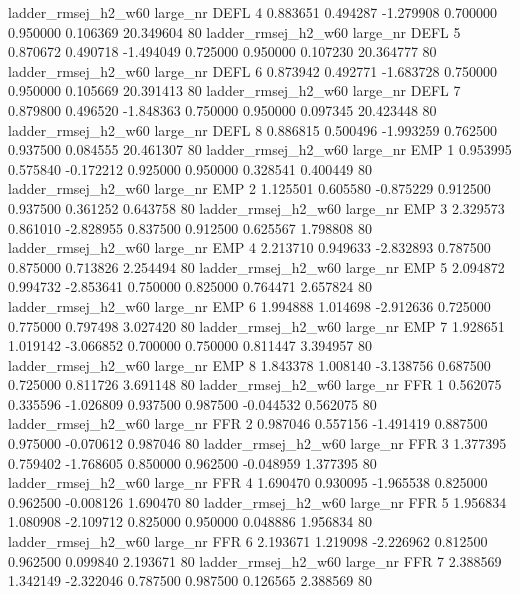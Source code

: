 ladder_rmsej_h2_w60   large_nr     DEFL                 4  0.883651  0.494287  -1.279908 0.700000 0.950000  0.106369   20.349604 80
ladder_rmsej_h2_w60   large_nr     DEFL                 5  0.870672  0.490718  -1.494049 0.725000 0.950000  0.107230   20.364777 80
ladder_rmsej_h2_w60   large_nr     DEFL                 6  0.873942  0.492771  -1.683728 0.750000 0.950000  0.105669   20.391413 80
ladder_rmsej_h2_w60   large_nr     DEFL                 7  0.879800  0.496520  -1.848363 0.750000 0.950000  0.097345   20.423448 80
ladder_rmsej_h2_w60   large_nr     DEFL                 8  0.886815  0.500496  -1.993259 0.762500 0.937500  0.084555   20.461307 80
ladder_rmsej_h2_w60   large_nr      EMP                 1  0.953995  0.575840  -0.172212 0.925000 0.950000  0.328541    0.400449 80
ladder_rmsej_h2_w60   large_nr      EMP                 2  1.125501  0.605580  -0.875229 0.912500 0.937500  0.361252    0.643758 80
ladder_rmsej_h2_w60   large_nr      EMP                 3  2.329573  0.861010  -2.828955 0.837500 0.912500  0.625567    1.798808 80
ladder_rmsej_h2_w60   large_nr      EMP                 4  2.213710  0.949633  -2.832893 0.787500 0.875000  0.713826    2.254494 80
ladder_rmsej_h2_w60   large_nr      EMP                 5  2.094872  0.994732  -2.853641 0.750000 0.825000  0.764471    2.657824 80
ladder_rmsej_h2_w60   large_nr      EMP                 6  1.994888  1.014698  -2.912636 0.725000 0.775000  0.797498    3.027420 80
ladder_rmsej_h2_w60   large_nr      EMP                 7  1.928651  1.019142  -3.066852 0.700000 0.750000  0.811447    3.394957 80
ladder_rmsej_h2_w60   large_nr      EMP                 8  1.843378  1.008140  -3.138756 0.687500 0.725000  0.811726    3.691148 80
ladder_rmsej_h2_w60   large_nr      FFR                 1  0.562075  0.335596  -1.026809 0.937500 0.987500 -0.044532    0.562075 80
ladder_rmsej_h2_w60   large_nr      FFR                 2  0.987046  0.557156  -1.491419 0.887500 0.975000 -0.070612    0.987046 80
ladder_rmsej_h2_w60   large_nr      FFR                 3  1.377395  0.759402  -1.768605 0.850000 0.962500 -0.048959    1.377395 80
ladder_rmsej_h2_w60   large_nr      FFR                 4  1.690470  0.930095  -1.965538 0.825000 0.962500 -0.008126    1.690470 80
ladder_rmsej_h2_w60   large_nr      FFR                 5  1.956834  1.080908  -2.109712 0.825000 0.950000  0.048886    1.956834 80
ladder_rmsej_h2_w60   large_nr      FFR                 6  2.193671  1.219098  -2.226962 0.812500 0.962500  0.099840    2.193671 80
ladder_rmsej_h2_w60   large_nr      FFR                 7  2.388569  1.342149  -2.322046 0.787500 0.987500  0.126565    2.388569 80
